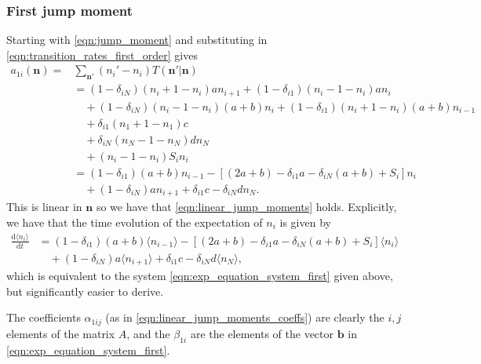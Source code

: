 \documentclass[a4paper,11pt]{report}
\numberwithin{equation}{section}
\newcommand{\diff}[2]{\frac{\mathrm{d} #1}{\mathrm{d} #2}}
\newcommand{\V}[1]{\mathbf{#1}}
\newcommand{\E}[1]{\langle #1 \rangle}
\begin{document}
\subsubsection{First jump moment}
Starting with \eqref{eqn:jump_moment} and substituting in
\eqref{eqn:transition_rates_first_order} gives
\begin{equation}
    \begin{aligned}
        a_{1i}(\V{n}) =& \sum_{\V{n}'} (n_i' - n_i) T(\V{n}' | \V{n})\\
        &= (1-\delta_{iN})(n_i + 1 - n_i)a n_{i+1}
        +  (1-\delta_{i1})(n_i - 1 - n_i)a n_i\\
        &\quad+ (1-\delta_{iN})(n_i - 1 - n_i)(a+b) n_i
        +  (1-\delta_{i1})(n_i + 1 - n_i)(a+b) n_{i-1}\\
        &\quad+ \delta_{i1}(n_1 + 1 - n_1) c\\
        &\quad+ \delta_{iN}(n_N - 1 - n_N) d n_N\\
        &\quad+ (n_i - 1 - n_i) S_i n_i\\
        &= (1-\delta_{i1})(a+b)n_{i-1} - \left[(2a+b) - \delta_{i1}a -
        \delta_{iN}(a+b) + S_i\right]n_i\\
        &\quad+ (1-\delta_{iN})an_{i+1} + \delta_{i1}c - \delta_{iN}d n_N.
    \end{aligned}
    \label{eqn:first_jump_mom_first_order}
\end{equation}
This is linear in \(\V{n}\) so we have that \eqref{eqn:linear_jump_moments}
holds. Explicitly, we have that the time evolution of the expectation of \(n_i\)
is given by
\begin{equation}
    \begin{aligned}
        \diff{\E{n_i}}{t} &= (1-\delta_{i1})(a+b)\E{n_{i-1}} - \left[(2a+b) -
        \delta_{i1}a - \delta_{iN}(a+b) + S_i\right]\E{n_i}\\
        &\quad+(1-\delta_{iN})a\E{n_{i+1}} + \delta_{i1}c - \delta_{iN}d \E{n_N},
    \end{aligned}
\end{equation}
which is equivalent to the system \eqref{eqn:exp_equation_system_first} given
above, but significantly easier to derive.

The coefficients \(\alpha_{1ij}\) (as in \eqref{eqn:linear_jump_moments_coeffs})
are clearly the \(i,j\) elements of the matrix \(A\), and the \(\beta_{1i}\) are the
elements of the vector \(\V{b}\) in \eqref{eqn:exp_equation_system_first}.
\end{document}
